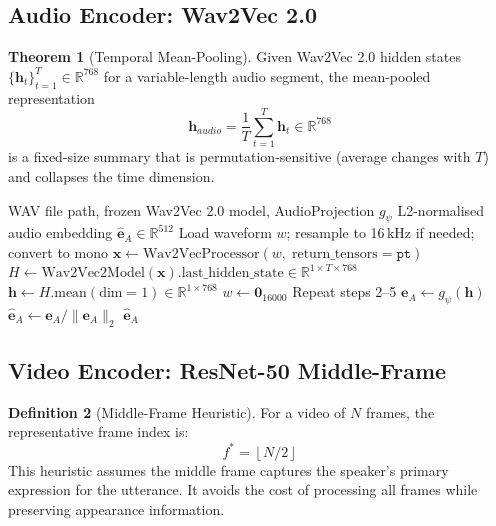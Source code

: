 \documentclass[12pt,a4paper]{article}
\theoremstyle{definition}
\newtheorem{theorem}{Theorem}[section]
\newtheorem{definition}[theorem]{Definition}
\begin{document}
\subsection{Audio Encoder: Wav2Vec 2.0}

\begin{theorem}[Temporal Mean-Pooling]
Given Wav2Vec 2.0 hidden states $\{{\mathbf{h}_t}\}_{t=1}^{T} \in \mathbb{R}^{768}$ for a variable-length audio segment, the mean-pooled representation
$$\mathbf{h}_{audio} = \frac{1}{T}\sum_{t=1}^{T} \mathbf{h}_t \in \mathbb{R}^{768}$$
is a fixed-size summary that is permutation-sensitive (average changes with $T$) and collapses the time dimension.
\end{theorem}

\begin{algorithm}[H]
\caption{\textsc{EncodeAudio} — Wav2Vec 2.0 Mean-Pool Embedding}
\label{alg:enc_audio}
\begin{algorithmic}[1]
\Require WAV file path, frozen Wav2Vec 2.0 model, AudioProjection $g_\psi$
\Ensure L2-normalised audio embedding $\hat{\mathbf{e}}_A \in \mathbb{R}^{512}$
  \State Load waveform $w$; resample to 16\,kHz if needed; convert to mono
  \State $\mathbf{x} \gets \text{Wav2VecProcessor}(w,\; \text{return\_tensors}=\texttt{pt})$
  \State $H \gets \text{Wav2Vec2Model}(\mathbf{x}).\text{last\_hidden\_state} \in \mathbb{R}^{1 \times T \times 768}$
  \State $\mathbf{h} \gets H.\text{mean}(\text{dim}=1) \in \mathbb{R}^{1 \times 768}$
\Else
  \State $w \gets \mathbf{0}_{16000}$ 
  \State Repeat steps 2--5
\EndIf
\State $\mathbf{e}_A \gets g_\psi(\mathbf{h})$
\State $\hat{\mathbf{e}}_A \gets \mathbf{e}_A / \|\mathbf{e}_A\|_2$
\State \Return $\hat{\mathbf{e}}_A$
\end{algorithmic}
\end{algorithm}

\subsection{Video Encoder: ResNet-50 Middle-Frame}

\begin{definition}[Middle-Frame Heuristic]
For a video of $N$ frames, the representative frame index is:
$$f^* = \left\lfloor N/2 \right\rfloor$$
This heuristic assumes the middle frame captures the speaker's primary expression for the utterance. It avoids the cost of processing all frames while preserving appearance information.
\end{definition}
\end{document}
